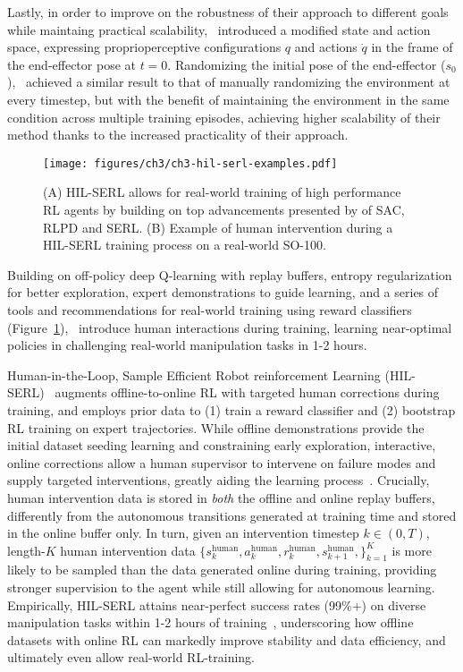 Lastly, in order to improve on the robustness of their approach to different goals while maintaing practical scalability,~\citet{luoSERLSoftwareSuite2025} introduced a modified state and action space, expressing proprioperceptive configurations \( q \)  and actions \( \dot q \) in the frame of the end-effector pose at \( t=0 \).
Randomizing the initial pose of the end-effector (\( s_0 \)),~\citet{luoSERLSoftwareSuite2025} achieved a similar result to that of manually randomizing the environment at every timestep, but with the benefit of maintaining the environment in the same condition across multiple training episodes, achieving higher scalability of their method thanks to the increased practicality of their approach.

\begin{figure}
    \centering
    \texttt{[image: figures/ch3/ch3-hil-serl-examples.pdf]}
    \caption{(A) HIL-SERL allows for real-world training of high performance RL agents by building on top advancements presented by of SAC, RLPD and SERL. (B) Example of human intervention during a HIL-SERL training process on a real-world SO-100.}
    \label{fig:hil-serl-blocks}
\end{figure}

Building on off-policy deep Q-learning with replay buffers, entropy regularization for better exploration, expert demonstrations to guide learning, and a series of tools and recommendations for real-world training using reward classifiers (Figure~\ref{fig:hil-serl-blocks}),~\citet{luoPreciseDexterousRobotic2024} introduce human interactions during training, learning near-optimal policies in challenging real-world manipulation tasks in 1-2 hours.

Human-in-the-Loop, Sample Efficient Robot reinforcement Learning (HIL-SERL)~\citep{luoPreciseDexterousRobotic2024} augments offline-to-online RL with targeted human corrections during training, and employs prior data to (1) train a reward classifier and (2) bootstrap RL training on expert trajectories.
While offline demonstrations provide the initial dataset seeding learning and constraining early exploration, interactive, online corrections allow a human supervisor to intervene on failure modes and supply targeted interventions, greatly aiding the learning process~\citep{luoPreciseDexterousRobotic2024}.
Crucially, human intervention data is stored in \emph{both} the offline and online replay buffers, differently from the autonomous transitions generated at training time and stored in the online buffer only.
In turn, given an intervention timestep \( k \in (0, T) \), length-\(K\) human intervention data \( \{ s^{\text{human}}_k, a^{\text{human}}_k, r^{\text{human}}_k, s^{\text{human}}_{k+1},\}_{k=1}^K \) is more likely to be sampled than the data generated online during training, providing stronger supervision to the agent while still allowing for autonomous learning.
Empirically, HIL-SERL attains near-perfect success rates (99\%+) on diverse manipulation tasks within 1-2 hours of training~\citep{luoPreciseDexterousRobotic2024}, underscoring how offline datasets with online RL can markedly improve stability and data efficiency, and ultimately even allow real-world RL-training.

